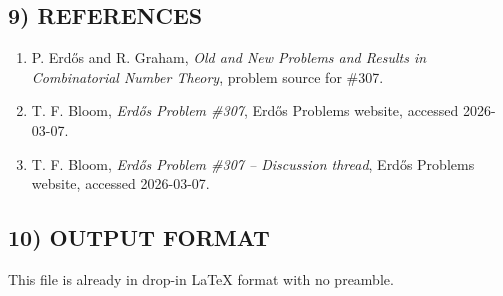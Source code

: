\subsection*{9) REFERENCES}
\begin{enumerate}
\item P. Erd\H{o}s and R. Graham, \emph{Old and New Problems and Results in Combinatorial Number Theory}, problem source for \#307.
\item T. F. Bloom, \emph{Erd\H{o}s Problem \#307}, Erd\H{o}s Problems website, accessed 2026-03-07.
\item T. F. Bloom, \emph{Erd\H{o}s Problem \#307 -- Discussion thread}, Erd\H{o}s Problems website, accessed 2026-03-07.
\end{enumerate}

\subsection*{10) OUTPUT FORMAT}
This file is already in drop-in LaTeX format with no preamble.


